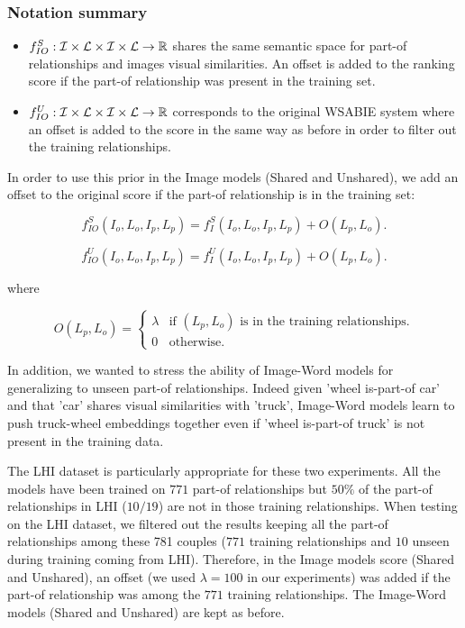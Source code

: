 \subsubsection*{Notation summary}

\begin{itemize}

\item $f_{IO}^S : {\cal I} \times {\cal L} \times {\cal I} \times {\cal L}
\rightarrow {\mathbb R}$  shares the same semantic space for part-of
relationships and images visual similarities. An offset is added to the ranking
score if the part-of relationship was present in the training set.

\item $f_{IO}^U : {\cal I} \times {\cal L} \times {\cal I} \times {\cal L}
\rightarrow {\mathbb R}$ corresponds to the original WSABIE system where an
offset is added to the score in the same way as before in order to filter out
the training relationships.

\end{itemize}


 In order to use this prior in the Image models (Shared and Unshared), we add
 an offset to the original score if the part-of relationship is in the training
 set:


\[
f_{IO}^S(I_o,L_o,I_p,L_p) = f_{I}^S(I_o,L_o,I_p,L_p) + O(L_p,L_o).
\]

\[
f_{IO}^U(I_o,L_o,I_p,L_p) = f_{I}^U(I_o,L_o,I_p,L_p) + O(L_p,L_o).
\]

where 

\[
O(L_p,L_o)=
\left\{
\begin{array}{rl}
\lambda & \textrm{if $(L_p,L_o)$ is in the training relationships.} \\
0 & \textrm{otherwise.}
\end{array}
\right.
\]

In addition,
we wanted to stress the ability of Image-Word models for generalizing to
unseen part-of relationships. Indeed given 'wheel is-part-of car' and that 'car'
shares visual similarities with 'truck', Image-Word models learn to push
truck-wheel embeddings together even if 'wheel is-part-of truck' is not present
in the training data.

The LHI dataset is particularly appropriate for these two experiments. All the models
have been trained on $771$ part-of relationships but $50\%$ of the part-of
relationships in LHI ($10/19$) are not in those training relationships.  When
testing on the LHI dataset, we filtered out the results keeping all the part-of
relationships among these 781 couples ($771$ training relationships and $10$
unseen during training coming from LHI). Therefore, in the Image models score (Shared and
Unshared), an offset (we used $\lambda=100$ in our experiments) was added if the part-of
relationship was among the $771$ training relationships. The Image-Word models
(Shared and Unshared) are kept as before.

